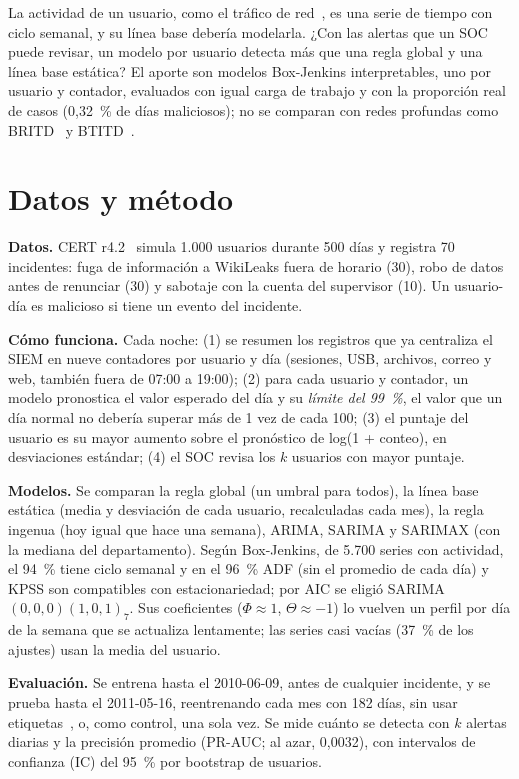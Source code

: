 \documentclass[runningheads,a4paper]{llncs}
\begin{document}
La actividad de un usuario, como el tráfico de red~\cite{brutlag2000}, es una serie de tiempo con ciclo semanal, y su línea base debería modelarla. ¿Con las alertas que un SOC puede revisar, un modelo por usuario detecta más que una regla global y una línea base estática? El aporte son modelos Box-Jenkins interpretables, uno por usuario y contador, evaluados con igual carga de trabajo y con la proporción real de casos (0,32~\% de días maliciosos); no se comparan con redes profundas como BRITD~\cite{song2024britd} y BTITD~\cite{zhang2026btitd}.

\section{Datos y método}

\textbf{Datos.} CERT r4.2~\cite{lindauer2020} simula 1.000 usuarios durante 500 días y registra 70 incidentes: fuga de información a WikiLeaks fuera de horario (30), robo de datos antes de renunciar (30) y sabotaje con la cuenta del supervisor (10). Un usuario-día es malicioso si tiene un evento del incidente.

\textbf{Cómo funciona.} Cada noche: (1) se resumen los registros que ya centraliza el SIEM en nueve contadores por usuario y día (sesiones, USB, archivos, correo y web, también fuera de 07:00 a 19:00); (2) para cada usuario y contador, un modelo pronostica el valor esperado del día y su \emph{límite del 99~\%}, el valor que un día normal no debería superar más de 1 vez de cada 100; (3) el puntaje del usuario es su mayor aumento sobre el pronóstico de log(1 + conteo), en desviaciones estándar; (4) el SOC revisa los $k$ usuarios con mayor puntaje.

\textbf{Modelos.} Se comparan la regla global (un umbral para todos), la línea base estática (media y desviación de cada usuario, recalculadas cada mes), la regla ingenua (hoy igual que hace una semana), ARIMA, SARIMA y SARIMAX (con la mediana del departamento). Según Box-Jenkins, de 5.700 series con actividad, el 94~\% tiene ciclo semanal y en el 96~\% ADF (sin el promedio de cada día) y KPSS son compatibles con estacionariedad; por AIC se eligió SARIMA$(0,0,0)(1,0,1)_7$. Sus coeficientes ($\Phi\approx 1$, $\Theta\approx -1$) lo vuelven un perfil por día de la semana que se actualiza lentamente; las series casi vacías (37~\% de los ajustes) usan la media del usuario.

\textbf{Evaluación.} Se entrena hasta el 2010-06-09, antes de cualquier incidente, y se prueba hasta el 2011-05-16, reentrenando cada mes con 182 días, sin usar etiquetas~\cite{tashman2000}, o, como control, una sola vez. Se mide cuánto se detecta con $k$ alertas diarias y la precisión promedio (PR-AUC; al azar, 0,0032), con intervalos de confianza (IC) del 95~\% por bootstrap de usuarios.
\end{document}
